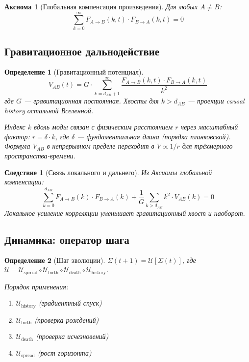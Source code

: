 \documentclass[11pt,a4paper]{article}
\newtheorem{definition}{Определение}[section]
\newtheorem{axiom}{Аксиома}[section]
\newtheorem{corollary}{Следствие}[section]
\theoremstyle{definition}
\begin{document}
\begin{axiom}[Глобальная компенсация произведения]
Для любых $A \neq B$:
\begin{equation}
    \sum_{k=0}^{\infty} F_{A \to B}(k, t) \cdot F_{B \to A}(k, t) = 0
\end{equation}
\end{axiom}

\subsection{Гравитационное дальнодействие}

\begin{definition}[Гравитационный потенциал]
\begin{equation}
    V_{AB}(t) = G \cdot \sum_{k = d_{AB}+1}^{\infty} \frac{F_{A \to B}(k, t) \cdot F_{B \to A}(k, t)}{k^2}
\end{equation}
где $G$ --- гравитационная постоянная. Хвосты для $k > d_{AB}$ --- проекции causal history остальной Вселенной.

Индекс $k$ вдоль моды связан с физическим расстоянием $r$ через масштабный фактор: $r = \delta \cdot k$, где $\delta$ --- фундаментальная длина (порядка планковской). Формула $V_{AB}$ в непрерывном пределе переходит в $V \propto 1/r$ для трёхмерного пространства-времени.
\end{definition}

\begin{corollary}[Связь локального и дальнего]
Из Аксиомы глобальной компенсации:
\begin{equation}
    \sum_{k=0}^{d_{AB}} F_{A \to B}(k) \cdot F_{B \to A}(k) + \frac{1}{G} \sum_{k > d_{AB}} k^2 \cdot V_{AB}(k) = 0
\end{equation}
Локальное усиление корреляции уменьшает гравитационный хвост и наоборот.
\end{corollary}

\subsection{Динамика: оператор шага}

\begin{definition}[Шаг эволюции]
$\Sigma(t+1) = \mathcal{U}[\Sigma(t)]$, где $\mathcal{U} = \mathcal{U}_{\text{spread}} \circ \mathcal{U}_{\text{birth}} \circ \mathcal{U}_{\text{death}} \circ \mathcal{U}_{\text{history}}$.

Порядок применения:
\begin{enumerate}
    \item $\mathcal{U}_{\text{history}}$ (градиентный спуск)
    \item $\mathcal{U}_{\text{birth}}$ (проверка рождений)
    \item $\mathcal{U}_{\text{death}}$ (проверка исчезновений)
    \item $\mathcal{U}_{\text{spread}}$ (рост горизонта)
\end{enumerate}
\end{definition}
\end{document}
